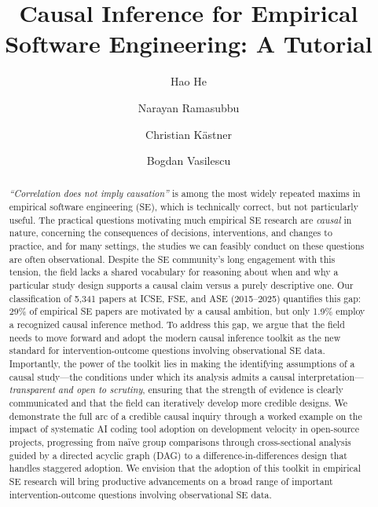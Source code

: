 \documentclass[manuscript,screen,review]{acmart}
\begin{document}
\title{Causal Inference for Empirical Software Engineering: A Tutorial}

\author{Hao He}

\author{Narayan Ramasubbu}

\author{Christian Kästner}

\author{Bogdan Vasilescu}

\begin{abstract}
\emph{``Correlation does not imply causation''} is among the most widely repeated maxims in empirical software engineering (SE), which is technically correct, but not particularly useful.
The practical questions motivating much empirical SE research are \emph{causal} in nature, concerning the consequences of decisions, interventions, and changes to practice, and for many settings, the studies we can feasibly conduct on these questions are often observational.
Despite the SE community's long engagement with this tension, the field lacks a shared vocabulary for reasoning about when and why a particular study design supports a causal claim versus a purely descriptive one.
Our classification of 5,341 papers at ICSE, FSE, and ASE (2015--2025) quantifies this gap: 29\% of empirical SE papers are motivated by a causal ambition, but only 1.9\% employ a recognized causal inference method.
To address this gap, we argue that the field needs to move forward and adopt the modern causal inference toolkit as the new standard for intervention-outcome questions involving observational SE data.
Importantly, the power of the toolkit lies in making the identifying assumptions of a causal study---the conditions under which its analysis admits a causal interpretation---\emph{transparent and open to scrutiny}, ensuring that the strength of evidence is clearly communicated and that the field can iteratively develop more credible designs.
We demonstrate the full arc of a credible causal inquiry through a worked example on the impact of systematic AI coding tool adoption on development velocity in open-source projects, progressing from na\"ive group comparisons through cross-sectional analysis guided by a directed acyclic graph (DAG) to a difference-in-differences design that handles staggered adoption.
We envision that the adoption of this toolkit in empirical SE research will bring productive advancements on a broad range of important intervention-outcome questions involving observational SE data.
\end{abstract}
\end{document}
